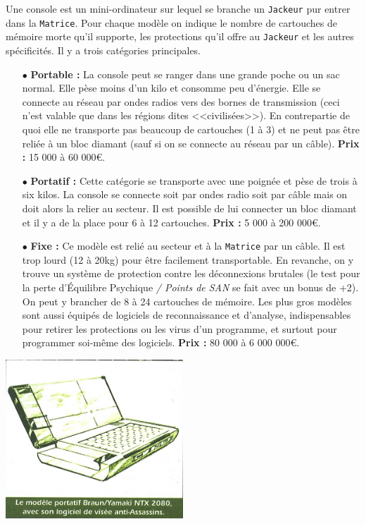 \documentclass[11pt,twoside,a4paper]{article}
\begin{document}
\begin{multicols*}{2}
Une console est un mini-ordinateur sur lequel se branche un \texttt{Jackeur} pur entrer dans la \texttt{Matrice}. Pour chaque mod{\`e}le on indique le nombre de cartouches de m{\'e}moire morte qu'il supporte, les protections qu'il offre au \texttt{Jackeur} et les autres sp{\'e}cificit{\'e}s. Il y a trois cat{\'e}gories principales. 
\begin{itemize}
	\item[$\bullet$] \textbf{Portable : }La console peut se ranger dans une grande poche ou un sac normal. Elle p{\`e}se moins d'un kilo et consomme peu d'{\'e}nergie. Elle se connecte au r{\'e}seau par ondes radios vers des bornes de transmission (ceci n'est valable que dans les r{\'e}gions dites <<civilis{\'e}es>>). En contrepartie de quoi elle ne transporte pas beaucoup de cartouches (1 {\`a} 3) et ne peut pas {\^e}tre reli{\'e}e {\`a} un bloc diamant (sauf si on se connecte au r{\'e}seau par un c{\^a}ble). \textbf{Prix : }15 000 {\`a} 60 000\euro . 
	\item[$\bullet$] \textbf{Portatif : }Cette cat{\'e}gorie se transporte avec une poign{\'e}e et p{\`e}se de trois {\`a} six kilos. La console se connecte soit par ondes radio soit par c{\^a}ble mais on doit alors la relier au secteur. Il est possible de lui connecter un bloc diamant et il y a de la place pour 6 {\`a} 12 cartouches. \textbf{Prix : }5 000 {\`a} 200 000\euro . 
	\item[$\bullet$] \textbf{Fixe : }Ce mod{\`e}le est reli{\'e} au secteur et {\`a} la \texttt{Matrice} par un c{\^a}ble. Il est trop lourd (12 {\`a} 20kg) pour {\^e}tre facilement transportable. En revanche, on y trouve un syst{\`e}me de protection contre les d{\'e}connexions brutales (le test pour la perte d'{\'E}quilibre Psychique \emph{/ Points de SAN} se fait avec un bonus de +2). On peut y brancher de 8 {\`a} 24 cartouches de m{\'e}moire. Les plus gros mod{\`e}les sont aussi {\'e}quip{\'e}s de logiciels de reconnaissance et d'analyse, indispensables pour retirer les protections ou les virus d'un programme, et surtout pour programmer soi-m{\^e}me des logiciels. \textbf{Prix : }80 000 {\`a} 6 000 000\euro . 
\end{itemize}

\begin{center} \includegraphics[width=0.50\textwidth]{img/consoleBraunYamaki.jpg} \end{center}


\end{multicols*}
\end{document}
